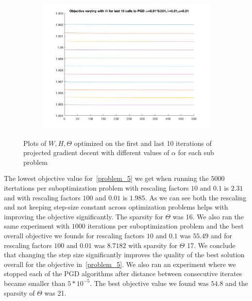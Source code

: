 \documentclass{article}
\newcommand{\0}{\mathrm{0}}
\newcommand{\1}{\mathrm{1}}
\begin{document}
\begin{figure}[H]
\begin{subfigure}[b]{0.3\textwidth}
  \end{subfigure}
\centering
  \begin{subfigure}[b]{0.3\textwidth}
    \includegraphics[width=\textwidth]{fixed-step-change-alpha-Th100last.png}
  \end{subfigure}

  \caption{Plots of $W, H, \Theta$ optimized on the first and last 10 iterations of projected gradient decent with different values of $\alpha$ for each sub problem}
\end{figure}
The lowest objective value for~\ref{problem_5} we get when running the $5000$ itertations per suboptimization problem with rescaling factors $10$ and $0.1$ is $2.31$ and with rescaling factors $100$ and $0.01$ is $1.985$. As we can see both the rescaling and not keeping step-size constant across optimization problems helps with improving the objective significantly. The sparsity for $\Theta$ was 16. We also ran the same experiment with $1000$ iterations per suboptimization problem and the best overall objective we founds for rescaling factors $10$ and $0.1$ was $55.49$ and for rescaling factors $100$ and $0.01$ was $8.7182$ with sparsity for $\Theta$ 17. We conclude that changing the step size significantly improves the quality of the best solution overall for the objective in~\ref{problem_5}. We also ran an experiment where we stopped each of the PGD algorithms after distance between consecutive iterates became smaller than $5*10^{-5}$. The best objective value we found was $54.8$ and the sparsity of $\Theta$ was 21.

\end{document}
